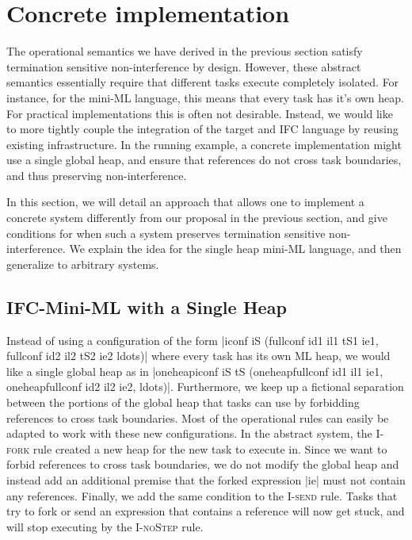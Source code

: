 \section{Concrete implementation}
\label{sec:concrete}

The operational semantics we have derived in the previous section
satisfy termination sensitive non-interference by design.  However,
these abstract semantics essentially require that different tasks
execute completely isolated.  For instance, for the mini-ML language,
this means that every task has it's own heap.  For practical
implementations this is often not desirable.  Instead, we would like to
more tightly couple the integration of the target and IFC
language by reusing existing infrastructure.  In the running example,
a concrete implementation might use a single global heap, and ensure
that references do not cross task boundaries, and thus preserving
non-interference.

In this section, we will detail an approach that allows one to implement
a concrete system differently from our proposal in the previous
section, and give conditions for when such a system preserves termination
sensitive non-interference.
We explain the idea for the single heap mini-ML language, and then
generalize to arbitrary systems.

\subsection{IFC-Mini-ML with a Single Heap}

Instead of using a configuration of the form
|iconf iS (fullconf id1 il1 tS1 ie1, fullconf id2 il2 tS2 ie2 ldots)|
where every task has its
own ML heap, we would like a single global heap as in
|oneheapiconf iS tS (oneheapfullconf id1 il1 ie1, oneheapfullconf id2 il2 ie2, ldots)|.
Furthermore, we keep up a fictional separation between the portions
of the global heap that tasks can use by forbidding references to
cross task boundaries. Most
of the operational rules can easily be adapted to work with these
new configurations.  In the abstract system, the \textsc{I-fork}
rule created a new heap for the new task to execute in.  Since we
want to forbid references to cross task boundaries, we do not modify
the global heap and instead add an additional premise that the forked
expression |ie| must not contain any references.
Finally, we add the same condition to the \textsc{I-send} rule.
Tasks that try to fork or send an expression that contains a
reference will now get stuck, and will stop executing by the
\textsc{I-noStep} rule.

